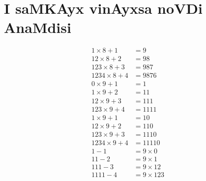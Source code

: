 \chapter{I saMKAyx vinAyxsa noVDi AnaMdisi}

\begin{align*}
1\times 8 + 1 &= 9\\
12 \times 8 + 2 &= 98\\
123 \times 8 + 3 &= 987\\
1234 \times 8 + 4 &= 9876\\[0.4cm]
0\times 9+1 &= 1\\          %
1\times 9+ 2 &= 11\\
12 \times 9 + 3 &= 111\\
123 \times 9 + 4 &=1111\\[0.4cm]
1\times 9 +1 &= 10\\ %
12\times 9 +2 &= 110\\
123 \times 9 + 3 &= 1110\\
1234 \times 9 +4 &= 11110\\[0.4cm]
1-1 &= 9 \times 0\\ %
11-2 &= 9 \times 1 \\
111 - 3 &= 9 \times 12\\
1111-4 &= 9 \times 123
\end{align*}

